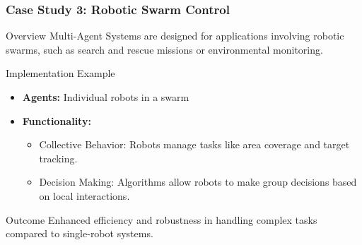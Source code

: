 \documentclass[aspectratio=169]{beamer}
\begin{document}
\begin{frame}[fragile]
    \frametitle{Case Study 3: Robotic Swarm Control}
    
    \begin{block}{Overview}
        Multi-Agent Systems are designed for applications involving robotic swarms, such as search and rescue missions or environmental monitoring.
    \end{block}

    \begin{block}{Implementation Example}
        \begin{itemize}
            \item \textbf{Agents:} Individual robots in a swarm
            \item \textbf{Functionality:}
                \begin{itemize}
                    \item Collective Behavior: Robots manage tasks like area coverage and target tracking.
                    \item Decision Making: Algorithms allow robots to make group decisions based on local interactions.
                \end{itemize}
        \end{itemize}
    \end{block}

    \begin{block}{Outcome}
        Enhanced efficiency and robustness in handling complex tasks compared to single-robot systems.
    \end{block}
\end{frame}
\end{document}
